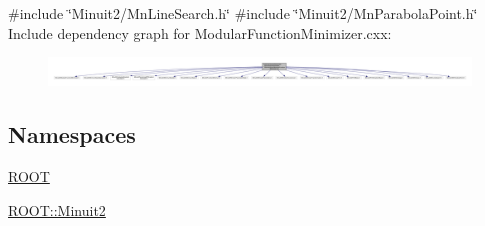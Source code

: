 {\ttfamily \#include \char`\"{}Minuit2/\+Mn\+Line\+Search.\+h\char`\"{}}\newline
{\ttfamily \#include \char`\"{}Minuit2/\+Mn\+Parabola\+Point.\+h\char`\"{}}\newline
Include dependency graph for Modular\+Function\+Minimizer.\+cxx\+:
\nopagebreak
\begin{figure}[H]
\begin{center}
\leavevmode
\includegraphics[width=350pt]{de/d01/adat-devel_2other__libs_2minuit_2src_2ModularFunctionMinimizer_8cxx__incl}
\end{center}
\end{figure}
\subsection*{Namespaces}
\begin{DoxyCompactItemize}
\item 
 \mbox{\hyperlink{namespaceROOT}{R\+O\+OT}}
\item 
 \mbox{\hyperlink{namespaceROOT_1_1Minuit2}{R\+O\+O\+T\+::\+Minuit2}}
\end{DoxyCompactItemize}
